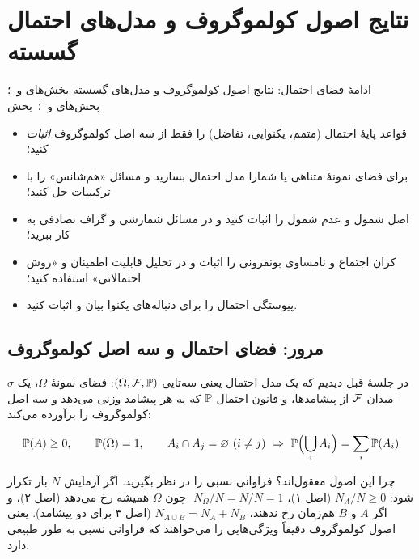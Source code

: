 \chapter{نتایج اصول کولموگروف و مدل‌های احتمال گسسته}
\label{ch:s3}

{ادامهٔ فضای احتمال: نتایج اصول کولموگروف و مدل‌های گسسته}
{ بخش‌های  و  \,؛\,  بخش‌های  و  \,؛\,  بخش }
{\begin{itemize}
  \item قواعد پایهٔ احتمال (متمم، یکنوایی، تفاضل) را فقط از سه اصل کولموگروف \emph{اثبات} کنید؛
  \item برای فضای نمونهٔ متناهی یا شمارا مدل احتمال بسازید و مسائل «هم‌شانس» را با ترکیبیات حل کنید؛
  \item اصل شمول و عدم شمول را اثبات کنید و در مسائل شمارشی و گراف تصادفی به کار ببرید؛
  \item کران اجتماع و نامساوی بونفرونی را اثبات و در تحلیل قابلیت اطمینان و «روش احتمالاتی» استفاده کنید؛
  \item پیوستگی احتمال را برای دنباله‌های یکنوا بیان و اثبات کنید.
\end{itemize}}

\section{مرور: فضای احتمال و سه اصل کولموگروف}

در جلسهٔ قبل دیدیم که یک مدل احتمال یعنی سه‌تایی $(\Omega,\F,\P)$: فضای نمونهٔ $\Omega$، یک $\sigma$-میدان $\F$ از پیشامدها، و قانون احتمال $\P$ که به هر پیشامد وزنی می‌دهد و سه اصل کولموگروف را برآورده می‌کند:

\begin{keyformula}
\[ \P(A)\ge0,\qquad \P(\Omega)=1,\qquad A_i\cap A_j=\varnothing\ (i\ne j)\ \Rightarrow\ \P\Bigl(\bigcup_i A_i\Bigr)=\sum_i\P(A_i) \]
\end{keyformula}

\begin{intuition}
چرا این اصول معقول‌اند؟ فراوانی نسبی را در نظر بگیرید. اگر آزمایش $N$ بار تکرار شود:
$N_A/N\ge0$ (اصل ۱)، $\;N_\Omega/N=N/N=1$ چون $\Omega$ همیشه رخ می‌دهد (اصل ۲)، و اگر $A$ و $B$ هم‌زمان رخ ندهند، $N_{A\cup B}=N_A+N_B$ (اصل ۳ برای دو پیشامد). یعنی اصول کولموگروف دقیقاً ویژگی‌هایی را می‌خواهند که فراوانی نسبی به طور طبیعی دارد.
\end{intuition}

